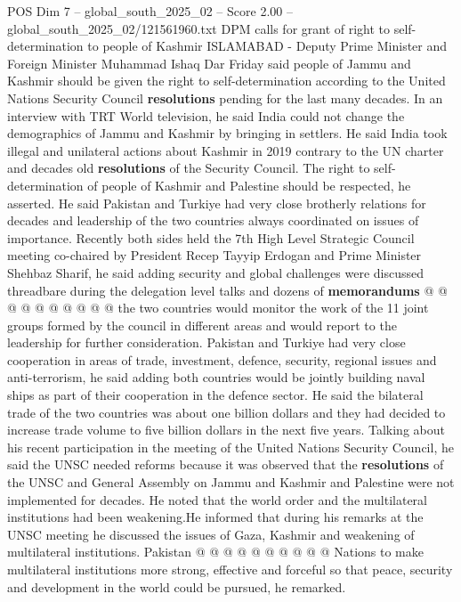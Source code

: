 \begin{textsample}{POS Dim 7 – global\_south\_2025\_02 – Score 2.00 – global\_south\_2025\_02/121561960.txt}  \label{ex:f7_pos_182}
DPM calls for grant of right to self-determination to people of Kashmir ISLAMABAD - Deputy Prime Minister and Foreign Minister Muhammad Ishaq Dar Friday said people of Jammu and Kashmir should be given the right to self-determination according to the United Nations Security Council \textbf{resolutions} pending for the last many decades.
In an interview with TRT World television, he said India could not change the demographics of Jammu and Kashmir by bringing in settlers.
He said India took illegal and unilateral actions about Kashmir in 2019 contrary to the UN charter and decades old \textbf{resolutions} of the Security Council.
The right to self-determination of people of Kashmir and Palestine should be respected, he asserted.
He said Pakistan and Turkiye had very close brotherly relations for decades and leadership of the two countries always coordinated on issues of importance.
Recently both sides held the 7th High Level Strategic Council meeting co-chaired by President Recep Tayyip Erdogan and Prime Minister Shehbaz Sharif, he said adding security and global challenges were discussed threadbare during the delegation level talks and dozens of \textbf{memorandums} @ @ @ @ @ @ @ @ @ @ the two countries would monitor the work of the 11 joint groups formed by the council in different areas and would report to the leadership for further consideration.
Pakistan and Turkiye had very close cooperation in areas of trade, investment, defence, security, regional issues and anti-terrorism, he said adding both countries would be jointly building naval ships as part of their cooperation in the defence sector.
He said the bilateral trade of the two countries was about one billion dollars and they had decided to increase trade volume to five billion dollars in the next five years.
Talking about his recent participation in the meeting of the United Nations Security Council, he said the UNSC needed reforms because it was observed that the \textbf{resolutions} of the UNSC and General Assembly on Jammu and Kashmir and Palestine were not implemented for decades.
He noted that the world order and the multilateral institutions had been weakening.He informed that during his remarks at the UNSC meeting he discussed the issues of Gaza, Kashmir and weakening of multilateral institutions.
Pakistan @ @ @ @ @ @ @ @ @ @ Nations to make multilateral institutions more strong, effective and forceful so that peace, security and development in the world could be pursued, he remarked.

\end{textsample}
